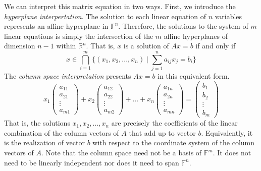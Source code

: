 \documentclass{article}
\begin{document}
    We can interpret this matrix equation in two ways. First, we introduce the \textit{hyperplane interpertation}. The solution to each linear equation of $n$ variables represents an affine hyperplane in $\mathbb{F}^n$. Therefore, the solutions to the system of $m$ linear equations is simply the intersection of the $m$ affine hyperplanes of dimension $n-1$ within $\mathbb{R}^n$. That is, $x$ is a solution of $A x = b$ if and only if  
    \begin{equation}
      x \in \bigcap_{i = 1}^m \Big\{ (x_1, x_2, ..., x_n) \; | \; \sum_{j = 1}^n a_{i j} x_j = b_i \Big\}
    \end{equation}
    The \textit{column space interpretation} presents $A x = b$ in this equivalent form. 
    \begin{equation}
      x_1 \begin{pmatrix}
      a_{1 1} \\ a_{2 1} \\ \vdots \\ a_{m 1}
      \end{pmatrix} + x_2 \begin{pmatrix}
      a_{1 2} \\ a_{2 2} \\ \vdots \\ a_{m 2}
      \end{pmatrix} + \ldots + x_n \begin{pmatrix}
      a_{1 n} \\ a_{2 n} \\ \vdots \\ a_{m n}
      \end{pmatrix} = \begin{pmatrix}
      b_1 \\ b_2 \\ \vdots \\ b_m
      \end{pmatrix}
    \end{equation}
    That is, the solutions $x_1, x_2, ..., x_n$ are precisely the coefficients of the linear combination of the column vectors of $A$ that add up to vector $b$. Equivalently, it is the realization of vector $b$ with respect to the coordinate system of the column vectors of $A$. Note that the column space need not be a basis of $\mathbb{F}^m$. It does not need to be linearly independent nor does it need to span $\mathbb{F}^n$. 
\end{document}
